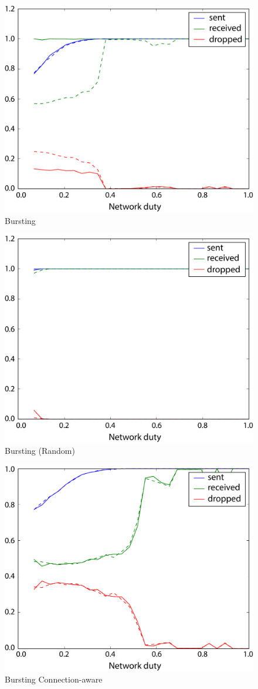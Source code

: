 \documentclass[oneside, a4paper, 11pt]{memoir}
\begin{document}
\begin{figure}[htbp]
	\centering
	\includegraphics[width=0.6\linewidth]{images/bursting.pdf}
	\caption{Bursting}	
\end{figure}

\begin{figure}[htbp]
	\centering
	\includegraphics[width=0.6\linewidth]{images/bursting_random.pdf}
	\caption{Bursting (Random)}	
\end{figure}

\begin{figure}[htbp]
	\centering
	\includegraphics[width=0.6\linewidth]{images/bursting_connaware.pdf}
	\caption{Bursting Connection-aware}	
\end{figure}
\end{document}
